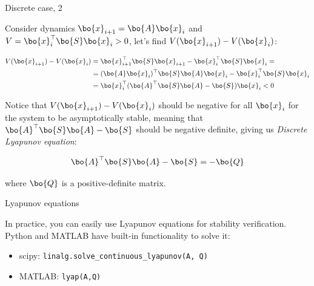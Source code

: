 \documentclass{beamer}
\begin{document}
\begin{frame}{Discrete case, 2}
\begin{flushleft}

Consider dynamics $\bo{x}_{i+1} = \bo{A}\bo{x}_i$ and $V = \bo{x}_i^\top\bo{S}\bo{x}_i > 0$, let's find $V(\bo{x}_{i+1}) - V(\bo{x}_i)$:

\begin{align}
	V(\bo{x}_{i+1}) - V(\bo{x}_i) &= \bo{x}_{i+1}^\top\bo{S}\bo{x}_{i+1}- 
	\bo{x}_i^\top\bo{S}\bo{x}_i =
	\\
	&= (\bo{A}\bo{x}_i)^\top\bo{S}\bo{A}\bo{x}_i - 
	\bo{x}_i^\top\bo{S}\bo{x}_i
	\\
	&= \bo{x}_i^\top(\bo{A}^\top\bo{S}\bo{A} - \bo{S})\bo{x}_i < 0
\end{align}

Notice that $V(\bo{x}_{i+1}) - V(\bo{x}_i)$ should be negative for all $\bo{x}_i$ for the system to be asymptotically stable, meaning that $\bo{A}^\top\bo{S}\bo{A} - \bo{S}$ should be negative definite, giving us \emph{Discrete Lyapunov equation}:

\begin{equation}
    \bo{A}^\top\bo{S}\bo{A} - \bo{S} = -\bo{Q}
\end{equation}

where $\bo{Q}$ is a positive-definite matrix.

\end{flushleft}
\end{frame}






\begin{frame}{Lyapunov equations}
\begin{flushleft}

In practice, you can easily use Lyapunov equations for stability verification. Python and MATLAB have built-in functionality to solve it:

\begin{itemize}
    \item scipy: \texttt{linalg.solve\_continuous\_lyapunov(A, Q)}
    \item MATLAB: \texttt{lyap(A,Q)}
\end{itemize}

\end{flushleft}
\end{frame}
\end{document}
